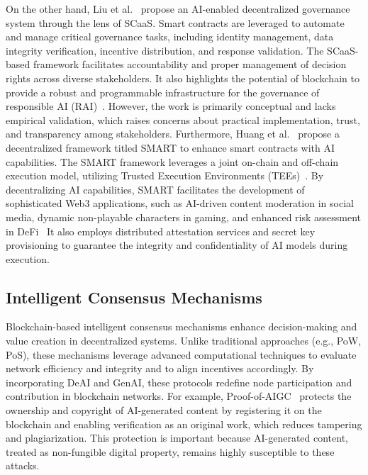 \documentclass[5p,twocolumn]{elsarticle}
\begin{document}
On the other hand, Liu et al.~\cite{liu2024decentralised} propose an AI-enabled decentralized governance system through the lens of SCaaS. Smart contracts are leveraged to automate and manage critical governance tasks, including identity management, data integrity verification, incentive distribution, and response validation. The SCaaS-based framework facilitates accountability and proper management of decision rights across diverse stakeholders. It also highlights the potential of blockchain to provide a robust and programmable infrastructure for the governance of responsible AI (RAI)~\cite{lu2024responsible,berman2024scoping}. However, the work is primarily conceptual and lacks empirical validation, which raises concerns about practical implementation, trust, and transparency among stakeholders. 
%
Furthermore, Huang et al.~\cite{huang2024advancing} propose a decentralized framework titled SMART to enhance smart contracts with AI capabilities. The SMART framework leverages a joint on-chain and off-chain execution model, utilizing Trusted Execution Environments (TEEs)~\cite{sabt2015trusted}. By decentralizing AI capabilities, SMART facilitates the development of sophisticated Web3 applications, such as AI-driven content moderation in social media, dynamic non-playable characters in gaming, and enhanced risk assessment in DeFi~\cite{tanaka2024taxonomy} It also employs distributed attestation services and secret key provisioning to guarantee the integrity and confidentiality of AI models during execution.


\subsection{Intelligent Consensus Mechanisms}
Blockchain-based intelligent consensus mechanisms enhance decision-making and value creation in decentralized systems. Unlike traditional approaches (e.g., PoW, PoS), these mechanisms leverage advanced computational techniques to evaluate network efficiency and integrity and to align incentives accordingly. By incorporating DeAI and GenAI, these protocols redefine node participation and contribution in blockchain networks. For example, Proof-of-AIGC~\cite{liu2024blockchainempowered} protects the ownership and copyright of AI-generated content by registering it on the blockchain and enabling verification as an original work, which reduces tampering and plagiarization. This protection is important because AI-generated content, treated as non-fungible digital property, remains highly susceptible to these attacks.
\end{document}
